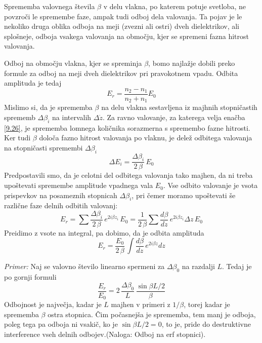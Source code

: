 \documentclass[11pt,fleqn]{book} %
\begin{document}
Sprememba valovnega števila $\beta$ v delu vlakna, po katerem potuje
svetloba, ne povzroči le spremembe faze, ampak tudi odboj dela valovanja.
Ta pojav je le nekoliko druga oblika odboja na meji (zvezni ali ostri)
dveh dielektrikov, ali splošneje, odboja vsakega valovanja na območju,
kjer se spremeni fazna hitrost valovanja.

Odboj na območju vlakna, kjer se spreminja $\beta$, bomo najlažje
dobili preko formule za odboj na meji dveh dielektrikov pri pravokotnem
vpadu. Odbita amplituda je tedaj 
\begin{equation}
E_{r}=\frac{n_{2}-n_{1}}{n_{2}+n_{1}}E_{0}\label{9.26}
\end{equation}
 Mislimo si, da je sprememba $\beta$ na delu vlakna sestavljena iz
majhnih stopničastih sprememb $\Delta\beta_{i}$ na intervalih $\Delta\dot{z}$.
Za ravno valovanje, za katerega velja enačba \ref{9.26}, je sprememba
lomnega količnika sorazmerna s spremembo fazne hitrosti. Ker tudi
$\beta$ določa fazno hitrost valovanja po vlaknu, je delež odbitega
valovanja na stopničasti spremembi $\Delta\beta_{i}$
\begin{equation}
\Delta E_{i}=\frac{\Delta\beta_{i}}{2\,\beta}\, E_{0}\label{9.27}
\end{equation}
 Predpostavili smo, da je celotni del odbitega valovanja tako majhen,
da ni treba upoštevati spremembe amplitude vpadnega vala $E_{0}$.
Vse odbito valovanje je vsota prispevkov na posameznih stopnicah $\Delta\beta_{i}$,
pri čemer moramo upoštevati še različne faze delnih odbitih valovanj:
\begin{equation}
E_{r}=\sum\frac{\Delta\beta_{i}}{2\,\beta}\, e^{2i\beta z_{i}}\, E_{0}=\frac{1}{2\,\beta}\sum\frac{d\beta}{dz}\, e^{2i\beta z_{i}}\Delta z\, E_{0}\label{9.28}
\end{equation}
 Preidimo z vsote na integral, pa dobimo, da je odbita amplituda 
\begin{equation}
E_{r}=\frac{E_{0}}{2\,\beta}\,\int\frac{d\beta}{dz}\, e^{2i\beta z}dz\label{9.29}
\end{equation}


\textit{Primer:} Naj se valovno število linearno spermeni za $\Delta\beta_{0}$
na razdalji $L$. Tedaj je po gornji formuli 
\begin{equation}
\frac{E_{r}}{E_{0}}=2\,\frac{\Delta\beta_{0}}{L}\,\frac{\sin\beta L/2}{\beta}\label{9.30}
\end{equation}
 Odbojnost je največja, kadar je $L$ majhen v primeri z $1/\beta$,
torej kadar je sprememba $\beta$ ostra stopnica. Čim počasnejša je
sprememba, tem manj je odboja, poleg tega pa odboja ni vsakič, ko
je $\sin\beta L/2=0$, to je, pride do destruktivne interference vseh
delnih odbojev.(Naloga: Odboj na erf stopnici).
\end{document}

